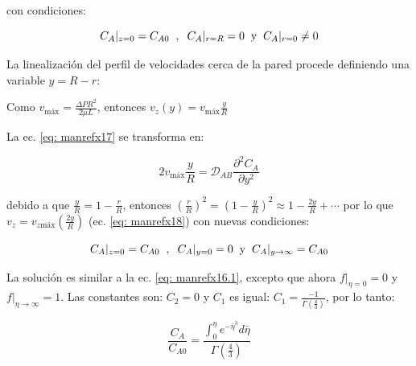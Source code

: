 con condiciones:

\begin{equation}
C_A|_{z=0} = C_{A0} \hspace{0.2cm} , \hspace{0.2cm} C_A|_{r=R} = 0 \hspace{0.2cm} \text{y} \hspace{0.2cm} C_A|_{r=0} \neq 0
\end{equation}

La linealización del perfil de velocidades cerca de la pared procede definiendo una variable $y = R-r$:

Como $v_{\text{máx}} = \frac{\Delta P R^2}{2 \mu L}$, entonces $v_z (y) = v_{\text{máx}} \frac{y}{R} $

La ec. \eqref{eq: manrefx17} se transforma en:

\begin{equation}
	2 v_{\text{máx}} \frac{y}{R} = \mathcal{D}_{AB} \frac{\partial^2 C_A}{\partial y^2}
\end{equation}

debido a que $\frac{y}{R} = 1 - \frac{r}{R}$, entonces $\left( \frac{r}{R} \right)^2 = \left( 1 - \frac{y}{R} \right)^2 \approx 1 - \frac{2 y}{R} + \cdots$ por lo que $v_z = v_{z \text{máx}} (\frac{2y}{R})$ (ec. \eqref{eq: manrefx18}) con nuevas condiciones:

\begin{equation}
C_A|_{z=0} = C_{A0} \hspace{0.2cm} , \hspace{0.2cm} C_A|_{y=0} = 0 \hspace{0.2cm} \text{y} \hspace{0.2cm} C_A|_{y \to \infty} = C_{A0}
\end{equation}

La solución es similar a la ec. \eqref{eq: manrefx16.1}, excepto que ahora $f|_{\eta = 0} = 0$ y \\ $f|_{\eta \to \infty} = 1$. Las constantes son: $C_2 = 0$ y $C_1$ es igual: $C_1 = \frac{-1}{\Gamma (\frac{4}{3})}$, por lo tanto:

\begin{equation}
	\frac{C_A}{C_{A0}} = \frac{\int_0^\eta e^{- \bar{\eta}^3} d \bar{\eta}}{\Gamma (\frac{4}{3})}
\end{equation}
